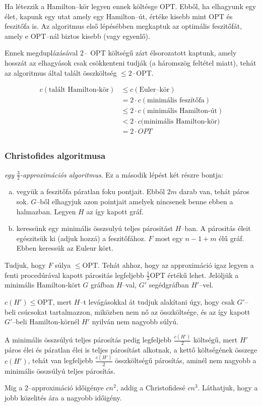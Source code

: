 Ha létezzik a Hamilton--kör legyen ennek költésge OPT. Ebből, ha elhagyunk egy
élet, kapunk egy utat amely egy Hamilton--út, értéke kisebb mint OPT és
feszitőfa is. Az algoritmus első lépésébben megkaptuk az optimális feszitőfát,
amely e OPT--nál biztos kisebb (vagy egyenlő).

Ennek megduplázásával $2 \cdot$ OPT költségű zárt élsorozatott kaptunk, amely
hosszát az elhagyások csak csökkenteni tudják (a háromszög feltétel miatt),
tehát az algoritmus által talált összköltség $\leq 2 \cdot$OPT.

\begin{align*}
 c(\mbox{talált Hamilton-kör}) &\leq c(\mbox{Euler--kör})		         \\ 
 						       &= 2  \cdot c(\mbox{minimális feszítőfa})       \\
 							   & \leq 2 \cdot c(\mbox{minimális Hamilton-út}) \\ 
 							   & < 2\cdot c(\mbox{minimális Hamilton-kör)}    \\ 
 							   & = 2\cdot OPT 								  \\
\end{align*}

\subsubsection{Christofides algoritmusa}

\emph{egy $\frac{3}{2}$-approximációs algoritmus}. Ez a második lépést két részre bontja:

\begin{enumerate}[(a)]
\item vegyük a feszitőfa páratlan foku pontjait. Ebből $2m$ darab van, tehát
páros sok. $G$--ből elhagyjuk azon pointjait amelyek nincsenek benne ebben a
halmazban. Legyen $H$ az így kapott gráf.
\item keressünk egy minimális összsulyú teljes párositást $H$--ban. A párositás
éleit egészitsük ki (adjuk hozzá) a feszitőfához. $F$ most egy $n-1+m$ élű gráf.
Ebben keressük az Euleur kört.
\end{enumerate}

Tudjuk, hogy $F$ súlya $\leq$OPT. Tehát ahhoz, hogy az approximáció igaz legyen
a fenti procedúrával kapott párositás legfeljebb $\frac{1}{2}$OPT értékű lehet.
Jelöljük a minimális Hamilton-kört $G$ gráfban $H$--val, $G'$ segédgráfban
$H'$--vel. 

$c(H') \leq$OPT, mert $H$--t levágásokkal át tudjuk alakítani úgy, hogy csak
$G'$--beli csúcsokat tartalmazzon, miközben nem nő az összköltsége, és az így
kapott $G'$--beli Hamilton-körnél $H'$ nyilván nem nagyobb súlyú.

A minimális összsúlyú teljes párosítás pedig legfeljebb $\frac{c(H')}{2}$
költségű, mert $H'$ páros élei és páratlan élei is teljes párosítást alkotnak, a
kettő költségének összege $c(H')$, tehát van legfeljebb $\frac{c(H')}{2}$
összköltségű párosítás, aminél nem nagyobb a minimális összsúlyú teljes
párosítás.

Mig a $2$--approximáció időigénye $cn^2$, addig a Christofidesé $cn^3$.
Láthatjuk, hogy a jobb közelités ára a nagyobb időigény.